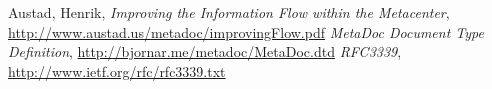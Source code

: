 \newpage
\begin{thebibliography}{99}
     Austad, Henrik, \textit{Improving the Information
    Flow within the Metacenter},
    \url{http://www.austad.us/metadoc/improvingFlow.pdf}
     \textit{MetaDoc Document Type Definition}, 
        \url{http://bjornar.me/metadoc/MetaDoc.dtd}
     \textit{RFC3339}, \url{http://www.ietf.org/rfc/rfc3339.txt}
\end{thebibliography}
